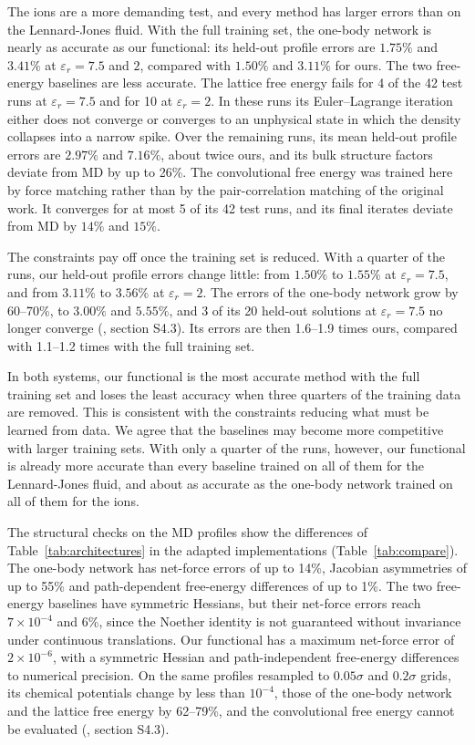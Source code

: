 The ions are a more demanding test, and every method has larger errors than on the Lennard-Jones fluid. With the full training set, the one-body network is nearly as accurate as our functional: its held-out profile errors are $1.75\%$ and $3.41\%$ at $\varepsilon_r=7.5$ and $2$, compared with $1.50\%$ and $3.11\%$ for ours. The two free-energy baselines are less accurate. The lattice free energy fails for 4 of the 42 test runs at $\varepsilon_r=7.5$ and for 10 at $\varepsilon_r=2$. In these runs its Euler--Lagrange iteration either does not converge or converges to an unphysical state in which the density collapses into a narrow spike. Over the remaining runs, its mean held-out profile errors are $2.97\%$ and $7.16\%$, about twice ours, and its bulk structure factors deviate from MD by up to 26\%. The convolutional free energy was trained here by force matching rather than by the pair-correlation matching of the original work. It converges for at most 5 of its 42 test runs, and its final iterates deviate from MD by $14\%$ and $15\%$.

The constraints pay off once the training set is reduced. With a quarter of the runs, our held-out profile errors change little: from $1.50\%$ to $1.55\%$ at $\varepsilon_r=7.5$, and from $3.11\%$ to $3.56\%$ at $\varepsilon_r=2$. The errors of the one-body network grow by 60--70\%, to $3.00\%$ and $5.55\%$, and 3 of its 20 held-out solutions at $\varepsilon_r=7.5$ no longer converge (\siref, section S4.3). Its errors are then 1.6--1.9 times ours, compared with 1.1--1.2 times with the full training set.
 
In both systems, our functional is the most accurate method with the full training set and loses the least accuracy when three quarters of the training data are removed. This is consistent with the constraints reducing what must be learned from data. We agree that the baselines may become more competitive with larger training sets. With only a quarter of the runs, however, our functional is already more accurate than every baseline trained on all of them for the Lennard-Jones fluid, and about as accurate as the one-body network trained on all of them for the ions.
 
The structural checks on the MD profiles show the differences of Table~\ref{tab:architectures} in the adapted implementations (Table~\ref{tab:compare}). The one-body network has net-force errors of up to 14\%, Jacobian asymmetries of up to 55\% and path-dependent free-energy differences of up to 1\%. The two free-energy baselines have symmetric Hessians, but their net-force errors reach $7\times10^{-4}$ and 6\%, since the Noether identity is not guaranteed without invariance under continuous translations. Our functional has a maximum net-force error of $2\times10^{-6}$, with a symmetric Hessian and path-independent free-energy differences to numerical precision. On the same profiles resampled to $0.05\sigma$ and $0.2\sigma$ grids, its chemical potentials change by less than $10^{-4}$, those of the one-body network and the lattice free energy by 62--79\%, and the convolutional free energy cannot be evaluated (\siref, section S4.3).
 
